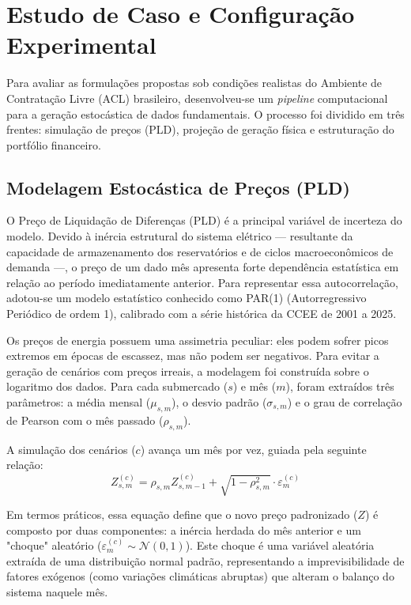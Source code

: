 
\section{Estudo de Caso e Configuração Experimental}
\label{sec:estudo_caso}

Para avaliar as formulações propostas sob condições realistas do Ambiente de Contratação Livre (ACL) brasileiro, desenvolveu-se um \textit{pipeline} computacional para a geração estocástica de dados fundamentais. O processo foi dividido em três frentes: simulação de preços (PLD), projeção de geração física e estruturação do portfólio financeiro.

\subsection{Modelagem Estocástica de Preços (PLD)}

O Preço de Liquidação de Diferenças (PLD) é a principal variável de incerteza do modelo. Devido à inércia estrutural do sistema elétrico — resultante da capacidade de armazenamento dos reservatórios e de ciclos macroeconômicos de demanda —, o preço de um dado mês apresenta forte dependência estatística em relação ao período imediatamente anterior. Para representar essa autocorrelação, adotou-se um modelo estatístico conhecido como PAR(1) (Autorregressivo Periódico de ordem 1), calibrado com a série histórica da CCEE de 2001 a 2025.

Os preços de energia possuem uma assimetria peculiar: eles podem sofrer picos extremos em épocas de escassez, mas não podem ser negativos. Para evitar a geração de cenários com preços irreais, a modelagem foi construída sobre o logaritmo dos dados. Para cada submercado ($s$) e mês ($m$), foram extraídos três parâmetros: a média mensal ($\mu_{s,m}$), o desvio padrão ($\sigma_{s,m}$) e o grau de correlação de Pearson com o mês passado ($\rho_{s,m}$).

A simulação dos cenários ($c$) avança um mês por vez, guiada pela seguinte relação:
\begin{equation}
    Z_{s,m}^{(c)} = \rho_{s,m} Z_{s,m-1}^{(c)} + \sqrt{1 - \rho_{s,m}^2} \cdot \varepsilon_m^{(c)}
\end{equation}

Em termos práticos, essa equação define que o novo preço padronizado ($Z$) é composto por duas componentes: a inércia herdada do mês anterior e um "choque" aleatório ($\varepsilon_m^{(c)} \sim \mathcal{N}(0,1)$). Este choque é uma variável aleatória extraída de uma distribuição normal padrão, representando a imprevisibilidade de fatores exógenos (como variações climáticas abruptas) que alteram o balanço do sistema naquele mês.

